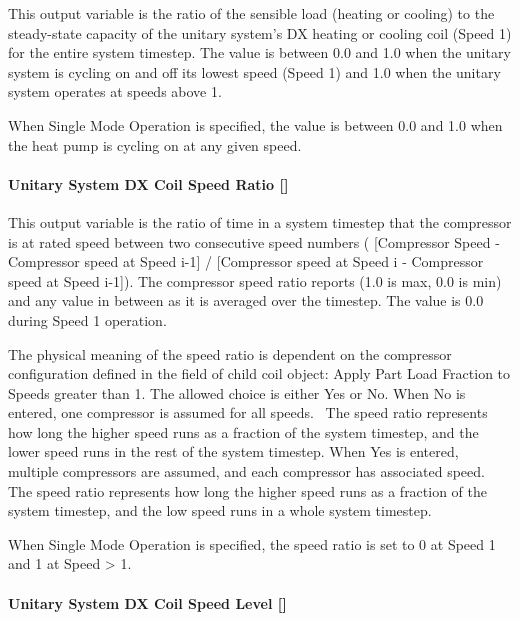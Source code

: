 This output variable is the ratio of the sensible load (heating or cooling) to the steady-state capacity of the unitary system's DX heating or cooling coil (Speed 1) for the entire system timestep. The value is between 0.0 and 1.0 when the unitary system is cycling on and off its lowest speed (Speed 1) and 1.0 when the unitary system operates at speeds above 1.

When Single Mode Operation is specified, the value is between 0.0 and 1.0 when the heat pump is cycling on at any given speed.

\paragraph{\texorpdfstring{Unitary System DX Coil Speed Ratio {[]}}{Unitary System DX Coil Speed Ratio }}\label{unitary-system-dx-coil-speed-ratio}

This output variable is the ratio of time in a system timestep that the compressor is at rated speed between two consecutive speed numbers ( {[}Compressor Speed - Compressor speed at Speed i-1{]} / {[}Compressor speed at Speed i - Compressor speed at Speed i-1{]}). The compressor speed ratio reports (1.0 is max, 0.0 is min) and any value in between as it is averaged over the timestep. The value is 0.0 during Speed 1 operation.

The physical meaning of the speed ratio is dependent on the compressor configuration defined in the field of child coil object: Apply Part Load Fraction to Speeds greater than 1. The allowed choice is either Yes or No. When No is entered, one compressor is assumed for all speeds. ~The speed ratio represents how long the higher speed runs as a fraction of the system timestep, and the lower speed runs in the rest of the system timestep. When Yes is entered, multiple compressors are assumed, and each compressor has associated speed. The speed ratio represents how long the higher speed runs as a fraction of the system timestep, and the low speed runs in a whole system timestep.

When Single Mode Operation is specified, the speed ratio is set to 0 at Speed 1 and 1 at Speed \textgreater{} 1.

\paragraph{\texorpdfstring{Unitary System DX Coil Speed Level {[]}}{Unitary System DX Coil Speed Level }}\label{unitary-system-dx-coil-speed-level}

